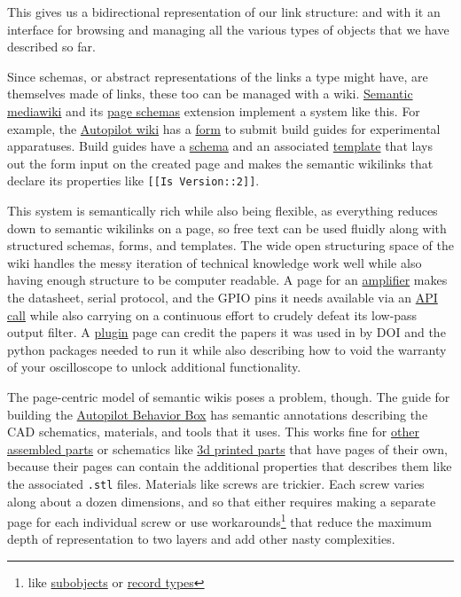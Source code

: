 This gives us a bidirectional representation of our link structure: and
with it an interface for browsing and managing all the various types of
objects that we have described so far.

Since schemas, or abstract representations of the links a type might
have, are themselves made of links, these too can be managed with a
wiki.
\href{https://www.semantic-mediawiki.org/wiki/Semantic_MediaWiki}{Semantic
mediawiki} and its
\href{https://www.mediawiki.org/wiki/Extension:Page_Schemas}{page
schemas} extension implement a system like this. For example, the
\href{https://wiki.auto-pi-lot.com}{Autopilot wiki} has a
\href{https://wiki.auto-pi-lot.com/index.php/Form:Build_Guide}{form} to
submit build guides for experimental apparatuses. Build guides have a
\href{https://wiki.auto-pi-lot.com/index.php/Category:Construction_Build_Guide}{schema}
and an associated
\href{https://wiki.auto-pi-lot.com/index.php/Template:Build_Guide}{template}
that lays out the form input on the created page and makes the semantic
wikilinks that declare its properties like
\texttt{{[}{[}Is\ Version::2{]}{]}}.

This system is semantically rich while also being flexible, as
everything reduces down to semantic wikilinks on a page, so free text
can be used fluidly along with structured schemas, forms, and templates.
The wide open structuring space of the wiki handles the messy iteration
of technical knowledge work well while also having enough structure to
be computer readable. A page for an
\href{https://wiki.auto-pi-lot.com/index.php/HiFiBerry_Amp2}{amplifier}
makes the datasheet, serial protocol, and the GPIO pins it needs
available via an
\href{https://www.semantic-mediawiki.org/wiki/Help:API}{API call} while
also carrying on a continuous effort to crudely defeat its low-pass
output filter. A
\href{https://wiki.auto-pi-lot.com/index.php/Plugin:Autopilot_Paper}{plugin}
page can credit the papers it was used in by DOI and the python packages
needed to run it while also describing how to void the warranty of your
oscilloscope to unlock additional functionality.

The page-centric model of semantic wikis poses a problem, though. The
guide for building the
\href{https://wiki.auto-pi-lot.com/index.php/Autopilot_Behavior_Box}{Autopilot
Behavior Box} has semantic annotations describing the CAD schematics,
materials, and tools that it uses. This works fine for
\href{https://wiki.auto-pi-lot.com/index.php/Autopilot_Tripoke}{other
assembled parts} or schematics like
\href{https://wiki.auto-pi-lot.com/index.php/Autopilot_Nosepoke_Cap}{3d
printed parts} that have pages of their own, because their pages can
contain the additional properties that describes them like the
associated \texttt{.stl} files. Materials like screws are trickier. Each
screw varies along about a dozen dimensions, and so that either requires
making a separate page for each individual screw or use
workarounds\footnote{like
  \href{https://www.semantic-mediawiki.org/wiki/Subobject}{subobjects}
  or
  \href{https://www.semantic-mediawiki.org/wiki/Help:Type_Record}{record
  types}} that reduce the maximum depth of representation to two layers
and add other nasty complexities.

